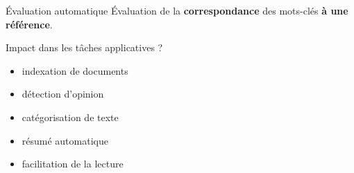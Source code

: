 \begin{frame}{\'Evaluation automatique}
    \'Evaluation de la \textbf{correspondance} des mots-clés \textbf{à une référence}.

    \begin{block}{Impact dans les tâches applicatives ?}
    \begin{itemize}
        \item indexation de documents
        \item détection d'opinion%
        \item catégorisation de texte%
        \item résumé automatique%
        \item facilitation de la lecture%
    \end{itemize}
    \end{block}
\end{frame}

